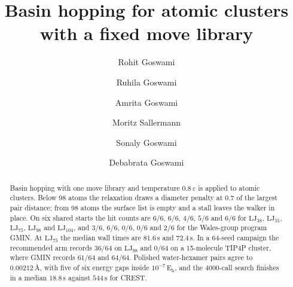 \documentclass[aip,jcp,preprint,amsmath,amssymb,floatfix]{revtex4-2}
\begin{document}
\title{Basin hopping for atomic clusters with a fixed move library}

\author{Rohit Goswami}
\author{Ruhila Goswami}
\author{Amrita Goswami}
\author{Moritz Sallermann}
\author{Sonaly Goswami}
\author{Debabrata Goswami}

\begin{abstract}
Basin hopping with one move library and temperature \(0.8\,\varepsilon\) is applied to atomic clusters.
Below 98 atoms the relaxation draws a diameter penalty at \(0.7\) of the largest pair distance; from 98 atoms the surface list is empty and a stall leaves the walker in place.
On six shared starts the hit counts are \(6/6\), \(6/6\), \(4/6\), \(5/6\) and \(6/6\) for \(\mathrm{LJ}_{38}\), \(\mathrm{LJ}_{55}\), \(\mathrm{LJ}_{75}\), \(\mathrm{LJ}_{98}\) and \(\mathrm{LJ}_{104}\), and \(3/6\), \(6/6\), \(0/6\), \(0/6\) and \(2/6\) for the Wales-group program GMIN.
At \(\mathrm{LJ}_{75}\) the median wall times are \(81.6\,\mathrm{s}\) and \(72.4\,\mathrm{s}\).
In a 64-seed campaign the recommended arm records \(36/64\) on \(\mathrm{LJ}_{98}\) and \(0/64\) on a 15-molecule TIP4P cluster, where GMIN records \(61/64\) and \(64/64\).
Polished water-hexamer pairs agree to \(0.00212\,\text{\AA}\), with five of six energy gaps inside \(10^{-7}\,\mathrm{E_h}\), and the 4000-call search finishes in a median \(18.8\,\mathrm{s}\) against \(544\,\mathrm{s}\) for CREST.
\end{abstract}

\maketitle
\end{document}
